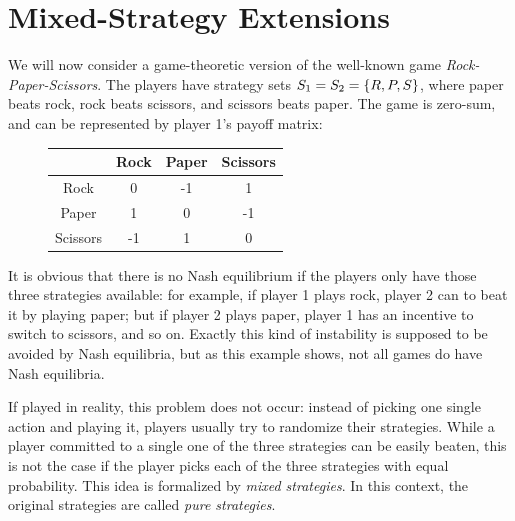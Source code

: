 \documentclass[a4paper]{scrreprt}
\begin{document}
    \section{Mixed-Strategy Extensions}
    
    \begin{ex}
        We will now consider a game-theoretic version of the well-known game \emph{Rock-Paper-Scissors}.
        The players have strategy sets $S_1 = S_2 = \{R, P, S\}$, where paper beats rock, rock beats scissors, and scissors beats paper. The game is zero-sum, and can be represented by player 1's payoff matrix:
        \begin{figure}[h]
            \centering
            \begin{tabular}{c|c|c|c|}
            	         & Rock & Paper & Scissors \\ \hline
            	  Rock   &  0   &  -1   &    1     \\ \hline
            	 Paper   &  1   &   0   &    -1    \\ \hline
            	Scissors &  -1  &   1   &    0     \\ \hline
            \end{tabular}
        \end{figure}
    
        It is obvious that there is no Nash equilibrium if the players only have those three strategies available: for example, if player 1 plays rock, player 2 can to beat it by playing paper; but if player 2 plays paper, player 1 has an incentive to switch to scissors, and so on. Exactly this kind of instability is supposed to be avoided by Nash equilibria, but as this example shows, not all games do have Nash equilibria.
        
        If played in reality, this problem does not occur: instead of picking one single action and playing it, players usually try to randomize their strategies. While a player committed to a single one of the three strategies can be easily beaten, this is not the case if the player picks each of the three strategies with equal probability. This idea is formalized by \emph{mixed strategies}. In this context, the original strategies are called \emph{pure strategies}.
        \label{ex:rockPaperScissors}
    \end{ex}
\end{document}
